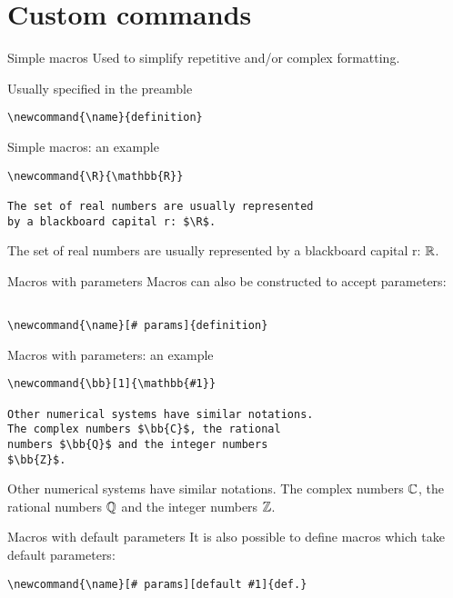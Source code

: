 \section{Custom commands}

\begin{frame}[fragile]{Simple macros}
  Used to simplify repetitive and/or complex formatting.

  Usually specified in the preamble
  \begin{lstlisting}
\newcommand{\name}{definition}
  \end{lstlisting}
\end{frame}

\begin{frame}[fragile]{Simple macros: an example}
  \begin{lstlisting}
\newcommand{\R}{\mathbb{R}}

The set of real numbers are usually represented
by a blackboard capital r: $\R$.
  \end{lstlisting}

  The set of real numbers are usually represented by a blackboard capital r:
  $\R$.
\end{frame}

\begin{frame}[fragile]{Macros with parameters}
  Macros can also be constructed to accept parameters:
  \begin{lstlisting}

\newcommand{\name}[# params]{definition}
  \end{lstlisting}
\end{frame}

\begin{frame}[fragile]{Macros with parameters: an example}
  \begin{lstlisting}
\newcommand{\bb}[1]{\mathbb{#1}}

Other numerical systems have similar notations. 
The complex numbers $\bb{C}$, the rational 
numbers $\bb{Q}$ and the integer numbers
$\bb{Z}$.

  \end{lstlisting}
  Other numerical systems have similar notations. The complex numbers $\bb{C}$,
  the rational numbers $\bb{Q}$ and the integer numbers $\bb{Z}$.
\end{frame}

\begin{frame}[fragile]{Macros with default parameters}
  It is also possible to define macros which take default parameters:
  \begin{lstlisting}
\newcommand{\name}[# params][default #1]{def.}

  \end{lstlisting}
\end{frame}

